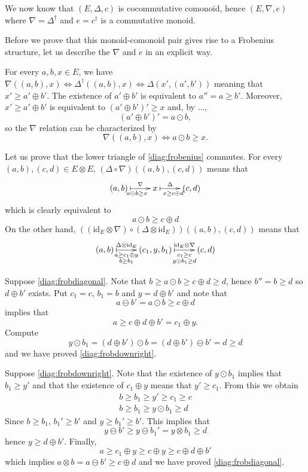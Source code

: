 \documentclass{article}
\theoremstyle{definition}
\newcommand{\id}{\mathrm{id}}
\begin{document}
We now know that $(E,\Delta,c)$ is cocommutative comonoid, hence $(E,\nabla,e)$
where $\nabla=\Delta^\dag$ and $e=c^\dag$ is a commutative monoid. 

Before we prove that this monoid-comonoid pair gives rise to a Frobenius structure,
let us describe the $\nabla$ and $e$ in an explicit way.

For every $a,b,x\in E$, we have 
$\nabla((a,b),x)\Leftrightarrow\Delta^\dag((a,b),x)\Leftrightarrow\Delta(x',(a',b'))$
meaning that $x'\geq a'\oplus b'$. The existence of $a'\oplus b'$ is equivalent
to $a''=a\geq b'$. Moreover, $x'\geq a'\oplus b'$ is equivalent to
$(a'\oplus b')'\geq x$ and, by ...,
$$
(a'\oplus b')'=a\odot b,
$$
so the $\nabla$ relation can be characterized by
$$
\nabla((a,b),x)\Leftrightarrow a\odot b\geq x.
$$

Let us prove that the lower triangle of \eqref{diag:frobenius} commutes. For every
$(a,b),(c,d)\in E\otimes E$, $(\Delta\circ\nabla)((a,b),(c,d))$ means that
\begin{equation*}
\xymatrix{
(a,b)
	\ar@{|->}[r]^-\nabla_{a\odot b\geq x}
&
x
	\ar@{|->}[r]^-\Delta_{x\geq c\oplus d}
&
(c,d)
}
\end{equation*}
which is clearly equivalent to 
\begin{equation}
\label{diag:frobdiagonal}
a\odot b\geq c\oplus d
\end{equation}
On the other hand, $((\id_E\otimes\nabla)\circ(\Delta\otimes\id_E))((a,b),(c,d))$
means that
\begin{equation}
\label{diag:frobdownright}
\xymatrix{
(a,b)
	\ar@{|->}[r]^-{\Delta\otimes\id_E}_-{\substack{a\geq c_1\oplus y\\b\geq
b_1}}
&
(c_1,y,b_1)
	\ar@{|->}[r]^-{\id_E\otimes\nabla}_-{\substack{c_1\geq c\\y\odot b_1\geq
d}}
&
(c,d)
}
\end{equation}

Suppose \eqref{diag:frobdiagonal}. Note that
$b\geq a\odot b\geq c\oplus d\geq d$, hence $b''=b\geq d$ so $d\oplus b'$
exists. Put $c_1=c$, $b_1=b$ and $y=d\oplus b'$ and note that 
$$
a\ominus b'=a\odot b\geq  c\oplus d
$$
implies that 
$$
a\geq c\oplus d\oplus b'=c_1\oplus y.
$$
Compute
$$
y\odot b_1=(d\oplus b')\odot b=(d\oplus b')\ominus b'=d\geq d
$$
and we have proved \eqref{diag:frobdownright}.

Suppose \eqref{diag:frobdownright}. Note that the existence of
$y\odot b_1$ implies that $b_1\geq y'$ and that the existence of
$c_1\oplus y$ means that $y'\geq c_1$. From this we obtain
\begin{align*}
b\geq b_1\geq y'\geq c_1\geq c\\
b\geq b_1\geq y\odot b_1\geq d
\end{align*}
Since $b\geq b_1$, $b_1'\geq b'$ and $y\geq b_1'\geq b'$. This implies that
$$
y\ominus b'\geq y\ominus b_1'=y\otimes b_1\geq d
$$
hence $y\geq d\oplus b'$. Finally,
$$
a\geq c_1\oplus y\geq c\oplus y\geq c\oplus d\oplus b'
$$
which implies $a\otimes b=a\ominus b'\geq c\oplus d$ and
we have proved \eqref{diag:frobdiagonal}.
\end{document}
